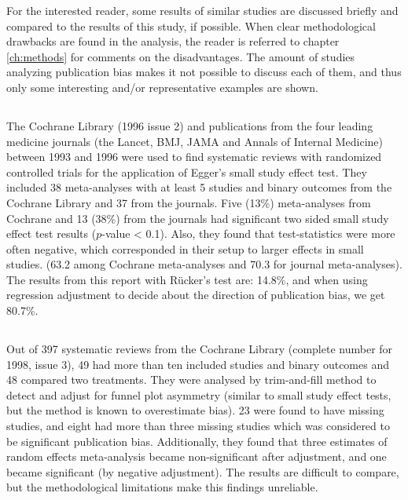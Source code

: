 \documentclass[11pt,a4paper,twoside]{book}\usepackage[]{graphicx}\usepackage[]{color}
\begin{document}
For the interested reader, some results of similar studies are discussed briefly and compared to the results of this study, if possible. 
When clear methodological drawbacks are found in the analysis, the reader is referred to chapter \ref{ch:methods} for comments on the disadvantages. The amount of studies analyzing publication bias makes it not possible to discuss each of them, and thus only some interesting and/or representative examples are shown.

\subsection{\citealp{Egger}}
The Cochrane Library (1996 issue 2) and publications from the four leading medicine journals (the Lancet, BMJ, JAMA and Annals of Internal Medicine) between 1993 and 1996 were used to find systematic reviews with randomized controlled trials for the application of Egger's small study effect test. They included 38 meta-analyses with at least 5 studies and binary outcomes from the Cochrane Library and 37 from the journals. Five (13\%) meta-analyses from Cochrane and 13 (38\%) from the journals had significant two sided small study effect test results ($p$-value < 0.1). Also, they found that test-statistics were more often negative, which corresponded in their setup to larger effects in small studies. (63.2 among Cochrane meta-analyses and 70.3 for journal meta-analyses). The results from this report with R\"ucker's test are: 14.8\%, and when using regression adjustment to decide about the direction of publication bias, we get 80.7\%.


\subsection{\citealp{sutton.2000}}
Out of 397 systematic reviews from the Cochrane Library (complete number for 1998, issue 3), 49 had more than ten included studies and binary outcomes and 48 compared two treatments. They were analysed by trim-and-fill method \citep{trimfill} to detect and adjust for funnel plot asymmetry (similar to small study effect tests, but the method is known to overestimate bias). 23 were found to have missing studies, and eight had more than three missing studies which was considered to be significant publication bias. Additionally, they found that three estimates of random effects meta-analysis became non-significant after adjustment, and one became significant (by negative adjustment). The results are difficult to compare, but the methodological limitations make this findings unreliable.
\end{document}
